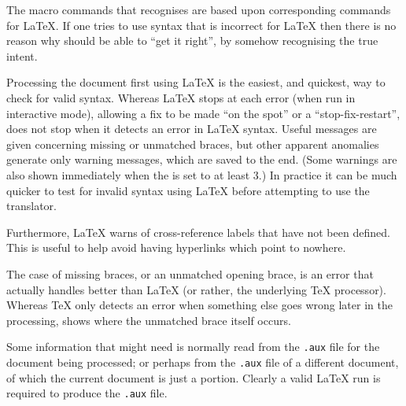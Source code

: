 \begin{htmllist}
%
\item[\LaTeX{} macros: ]
The macro commands that \latextohtml{} recognises are based upon
corresponding commands for \LaTeX. If one tries to use syntax that is
incorrect for \LaTeX{} then there is no reason why \latextohtml{} should
be able to ``get it right'', by somehow recognising the true intent.


%
\item[error checking: ]
Processing the document first using \LaTeX{} is the easiest, 
and quickest, way to check for valid syntax.\html{\\}
Whereas \LaTeX{} stops at each error (when run in interactive mode),
allowing a fix to be made ``on the spot'' or a ``stop-fix-restart'',
\latextohtml{} does not stop when it detects an error in \LaTeX{} syntax.
Useful messages are given concerning missing or unmatched braces,
but other apparent anomalies generate only warning messages, 
which are saved to the end. 
(Some warnings are also shown immediately when the  
 is set to at least 3.)\html{\\}
In practice it can be much quicker to test for invalid syntax using \LaTeX{} before 
attempting to use the \latextohtml{} translator.

Furthermore, \LaTeX{} warns of cross-reference labels that have not been defined. 
This is useful to help avoid having hyperlinks which point to nowhere.

%
\html{\\}\noindent
The case of missing braces, or an unmatched opening brace, 
is an error that \latextohtml{} actually handles better than \LaTeX{} 
(or rather, the underlying \TeX{} processor).
Whereas \TeX{} only detects an error when something else goes wrong
later in the processing, \latextohtml{} shows where the
unmatched brace itself occurs. 


\item[auxiliary file: ]
Some information that \latextohtml{} might need is normally
read from the \texttt{.aux} file for the document being processed;
or perhaps from the \texttt{.aux} file of a different document,
of which the current document is just a portion. 
Clearly a valid \LaTeX{} run is required to produce the \texttt{.aux} file.


\end{htmllist}
